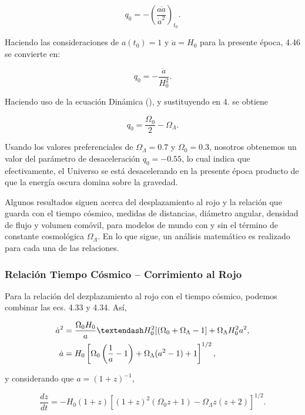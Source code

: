 \documentclass[11pt]{article}
\begin{document}
{    \begin{equation}
        q_0= - \left( \frac{a\ddot{a}}{\dot{a}^2}\right)_{t_0}.
    \end{equation}
    
    Haciendo las consideraciones de $a(t_0)=1$ y $\dot{a}=H_0$ para la presente época, 4.46 se convierte en: 
    
    \begin{equation}
        q_0= - \frac{\ddot{a}}{H_0^2}.
    \end{equation}
    
    
    Haciendo uso de la ecuación Dinámica (), y sustituyendo en 4. se obtiene

\begin{equation}
	q_0 = \frac{\Omega_0}{2} - \Omega_{\Lambda}.
\end{equation}

Usando los valores preferenciales de $\Omega_{\Lambda} = 0.7$ y $\Omega_0 = 0.3$, nosotros obtenemos un valor del parámetro de desaceleración $q_0 = -0.55$, lo cual indica que efectivamente, el Universo se está desacelerando en la presente época producto de que la energía oscura domina sobre la gravedad. 

Algunos resultados siguen acerca del desplazamiento al rojo y la relación que guarda con el tiempo cósmico, medidas de distancias, diámetro angular, densidad de flujo y volumen comóvil, para modelos de mundo con y sin el término de constante cosmológica $\Omega_{\Lambda}$. En lo que sigue, un análisis matemático es realizado para cada una de las relaciones. 

\subsubsection{Relación Tiempo Cósmico – Corrimiento al Rojo}

Para la relación del dezplazamiento al rojo con el tiempo cósmico, podemos combinar las ecs. 4.33 y 4.34. Así, 

    \begin{align}
	    \dot{a}^2 &= \frac{\Omega_0 H_0}{a} – H_0^2 [(\Omega_0 + \Omega_{\Lambda} -1] +  \Omega_{\Lambda}H_0^2 a^2, \notag \\
	    \dot{a} & = H_0 \left[ \Omega_0 \left( \frac{1}{a} - 1 \right) + \Omega_{\Lambda}(a^2 - 1) + 1 \right]^{1/2},
    \end{align}

y considerando que $a = (1+z)^{-1}$,

    \begin{equation}
	    \frac{dz}{dt} = - H_0(1+z) [ (1+z)^2 (\Omega_0 z + 1) - \Omega_{\Lambda} z (z+2) ]^{1/2}.
    \end{equation}

}
\end{document}
